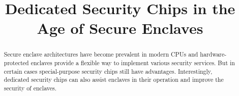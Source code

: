 

\graphicspath{{images/}}

\title{Dedicated Security Chips in the Age of Secure Enclaves} 


\maketitle
\thispagestyle{empty}

\begin{abstract}
Secure enclave architectures have become prevalent in modern CPUs and hardware-protected enclaves provide a flexible way to implement various security services. But in certain cases special-purpose security chips still have advantages. Interestingly, dedicated security chips can also assist enclaves in their operation and improve the security of enclaves.
\end{abstract}












